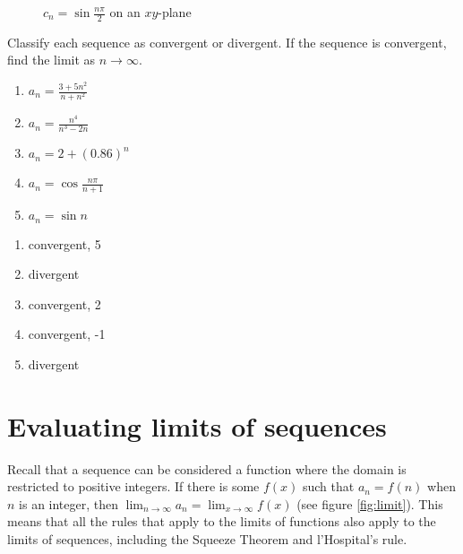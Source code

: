 \begin{figure}[htbp]
\centering
    \caption{$c_n =\sin{\frac{n\pi}{2}}$ on an $xy$-plane}
    \label{fig:sineseq}
\end{figure}

\begin{Exercise}[label=seqcalc3]
Classify each sequence as convergent or divergent. If the sequence is 
convergent, find the limit as $n \to \infty$.
\begin{enumerate}
\item $a_n = \frac{3 + 5n^2}{n + n^2}$
\item $a_n = \frac{n^4}{n^3 - 2n}$
\item $a_n = 2 + (0.86)^n$
\item $a_n = \cos{\frac{n\pi}{n+1}}$
\item $a_n = \sin{n}$
\end{enumerate}
\end{Exercise}

\begin{Answer}[ref=seqcalc3]
\begin{enumerate}
\item convergent, 5
\item divergent
\item convergent, 2
\item convergent, -1
\item divergent
\end{enumerate}
\end{Answer}

\section{Evaluating limits of sequences}
Recall that a sequence can be considered a function where the domain 
is restricted to positive integers. If there is some $f(x)$ such that 
$a_n = f(n)$ when $n$ is an integer, then $\lim_{n \to \infty} a_n = 
\lim_{x \to \infty} f(x)$ (see figure \ref{fig:limit}). This means 
that all the rules that apply to the limits of functions also apply 
to the limits of sequences, including the Squeeze Theorem and 
l'Hospital's rule. 

